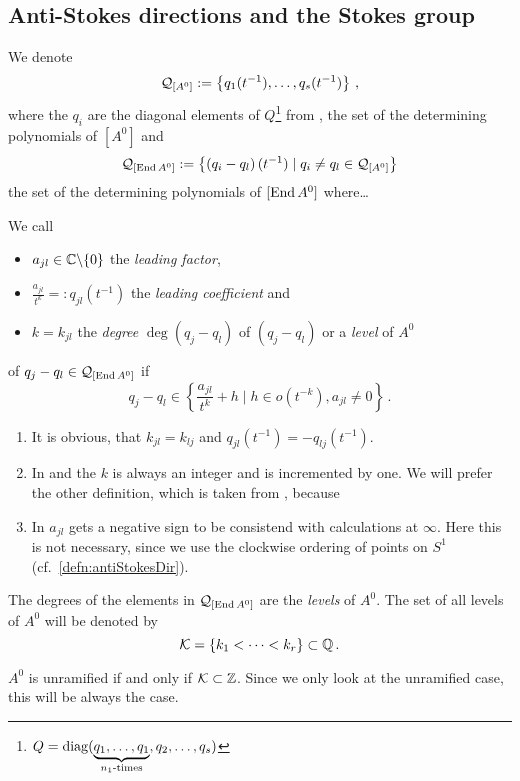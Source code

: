 \subsection{Anti-Stokes directions and the Stokes group}
\begin{comment}
  \cite[I.4]{Loday1994}
\end{comment}
We denote
\[
  \mathcal{Q}_{[A^0]}
  :=
  \left\{q_1(t^{-1}),\dots,q_s(t^{-1})\right\}
  \,,
\]
where the $q_i$ are the diagonal elements of $Q$\footnote{$Q=\operatorname{diag}(
\underset{n_1\text{-times}}{\underbrace{q_1,\dots,q_1}},q_2,\dots ,q_s)$}
from \TODO{},
the set of the determining polynomials of $[A^0]$ and
\[
  \mathcal{Q}_{[\operatorname{End} A^0]}:=\left\{\left(q_i-q_l\right)(t^{-1})
    \mid q_i \neq q_l \in\mathcal{Q}_{[A^0]}
  \right\}
\]
the set of the determining polynomials of $[\operatorname{End} A^0]$ where\dots
\begin{defn}
  We call
  \begin{itemize}
    \item $a_{jl}\in\mathbb{C}\backslash\{0\}$ the \emph{leading factor},
    \item $\frac{a_{jl}}{t^{k}}=:q_{jl}(t^{-1})$ the \emph{leading
      coefficient} and
    \item $k=k_{jl}$ the \emph{degree} $\deg(q_j-q_l)$ of $(q_j-q_l)$ or a
      \emph{level} of $A^0$
  \end{itemize}
  of $q_j-q_l\in\mathcal{Q}_{[\operatorname{End} A^0]}$ if
  \[
    q_j-q_l\in\left\{\frac{a_{jl}}{t^{k}}+h \mid h \in o(t^{-k}), a_{jl}\neq0
    \right\}\,.
  \]
  \begin{s-rem}
    \begin{enumerate}
      \item It is obvious, that $k_{jl}=k_{lj}$ and
        $q_{jl}(t^{-1})=-q_{lj}(t^{-1})$.
      \item In \cite{boalch} and \cite{thboalch} the $k$ is always an integer
        and is incremented by one. We will prefer the other definition, which
        is taken from \cite{Loday1994}, because \TODO
      \item In \cite[Def.4.3.6]{Loday2014} $a_{jl}$ gets a negative sign to
        be consistend with calculations at $\infty$. Here this is not
        necessary, since we use the clockwise ordering of points on $S^1$
        (cf.~\ref{defn:antiStokesDir}).
        \begin{comment}
          Does that mean, that, to be consistend with \cite{boalch}, one has to
          invert the permutation matrix?
        \end{comment}
    \end{enumerate}
  \end{s-rem}
  The degrees of the elements in $\mathcal{Q}_{[\operatorname{End} A^0]}$ are the
  \emph{levels} of $A^0$.
  The set of all levels of $A^0$ will be denoted by
  \[
    \mathcal{K}=\{k_1<\dots<k_r\} \subset \mathbb{Q} \,.
  \]
  \begin{s-rem}
    $A^0$ is unramified if and only if $\mathcal{K}\subset\mathbb{Z}$. Since we only look at
    the unramified case, this will be always the case.
  \end{s-rem}
\end{defn}

